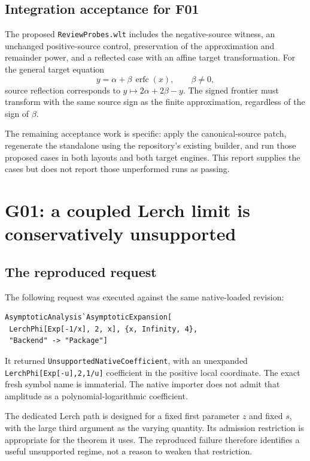 \documentclass[11pt,a4paper]{article}
\newcommand{\code}[1]{\nolinkurl{#1}}
\newcommand{\erfc}{\operatorname{erfc}}
\begin{document}
\subsection{Integration acceptance for F01}

The proposed \code{ReviewProbes.wlt} includes the negative-source witness, an
unchanged positive-source control, preservation of the approximation and
remainder power, and a reflected case with an affine target transformation.
For the general target equation
\[
 y=\alpha+\beta\,\erfc(x),\qquad \beta\ne0,
\]
source reflection corresponds to $y\mapsto2\alpha+2\beta-y$. The signed
frontier must transform with the same source sign as the finite approximation,
regardless of the sign of $\beta$.

The remaining acceptance work is specific: apply the canonical-source patch,
regenerate the standalone using the repository's existing builder, and run
those proposed cases in both layouts and both target engines. This report
supplies the cases but does not report those unperformed runs as passing.

\section{G01: a coupled Lerch limit is conservatively unsupported}

\subsection{The reproduced request}

The following request was executed against the same native-loaded revision:
\begin{lstlisting}
AsymptoticAnalysis`AsymptoticExpansion[
 LerchPhi[Exp[-1/x], 2, x], {x, Infinity, 4},
 "Backend" -> "Package"]
\end{lstlisting}
It returned \code{UnsupportedNativeCoefficient}, with an unexpanded
\code{LerchPhi[Exp[-u],2,1/u]} coefficient in the positive local coordinate.
The exact fresh symbol name is immaterial. The native importer does not
admit that amplitude as a polynomial-logarithmic coefficient.

The dedicated Lerch path is designed for a fixed first parameter $z$ and fixed
$s$, with the large third argument as the varying quantity. Its admission
restriction is appropriate for the theorem it uses. The reproduced failure
therefore identifies a useful unsupported regime, not a reason to weaken that
restriction.\cite{dirichlet,nativeimport}
\end{document}
